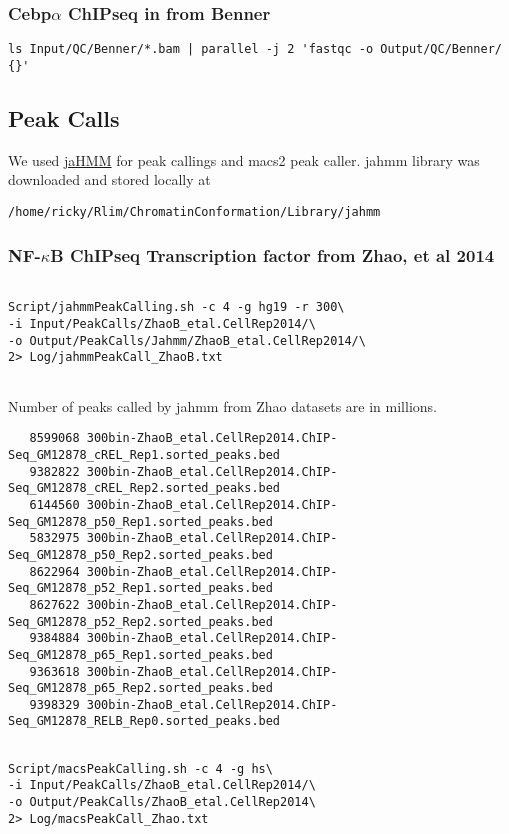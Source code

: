 \documentclass{article}\usepackage[]{graphicx}\usepackage[]{color}
\begin{document}
\subsubsection{Cebp$\alpha$ ChIPseq in from Benner}
\begin{verbatim}
ls Input/QC/Benner/*.bam | parallel -j 2 'fastqc -o Output/QC/Benner/ {}'
\end{verbatim}

\subsection{Peak Calls}
We used \href{https://github.com/gui11aume/zerone/tree/master/doc}{jaHMM} for peak callings and macs2 peak caller.
jahmm library was downloaded and stored locally at 

\verb|/home/ricky/Rlim/ChromatinConformation/Library/jahmm|

\subsubsection{NF-$\kappa$B ChIPseq Transcription factor from Zhao, et al 2014}
\begin{verbatim}

Script/jahmmPeakCalling.sh -c 4 -g hg19 -r 300\ 
-i Input/PeakCalls/ZhaoB_etal.CellRep2014/\ 
-o Output/PeakCalls/Jahmm/ZhaoB_etal.CellRep2014/\ 
2> Log/jahmmPeakCall_ZhaoB.txt 


\end{verbatim}

Number of peaks called by jahmm from Zhao datasets are in millions. 
\begin{verbatim}
   8599068 300bin-ZhaoB_etal.CellRep2014.ChIP-Seq_GM12878_cREL_Rep1.sorted_peaks.bed
   9382822 300bin-ZhaoB_etal.CellRep2014.ChIP-Seq_GM12878_cREL_Rep2.sorted_peaks.bed
   6144560 300bin-ZhaoB_etal.CellRep2014.ChIP-Seq_GM12878_p50_Rep1.sorted_peaks.bed
   5832975 300bin-ZhaoB_etal.CellRep2014.ChIP-Seq_GM12878_p50_Rep2.sorted_peaks.bed
   8622964 300bin-ZhaoB_etal.CellRep2014.ChIP-Seq_GM12878_p52_Rep1.sorted_peaks.bed
   8627622 300bin-ZhaoB_etal.CellRep2014.ChIP-Seq_GM12878_p52_Rep2.sorted_peaks.bed
   9384884 300bin-ZhaoB_etal.CellRep2014.ChIP-Seq_GM12878_p65_Rep1.sorted_peaks.bed
   9363618 300bin-ZhaoB_etal.CellRep2014.ChIP-Seq_GM12878_p65_Rep2.sorted_peaks.bed
   9398329 300bin-ZhaoB_etal.CellRep2014.ChIP-Seq_GM12878_RELB_Rep0.sorted_peaks.bed
\end{verbatim}

\begin{verbatim}

Script/macsPeakCalling.sh -c 4 -g hs\ 
-i Input/PeakCalls/ZhaoB_etal.CellRep2014/\
-o Output/PeakCalls/ZhaoB_etal.CellRep2014\ 
2> Log/macsPeakCall_Zhao.txt

\end{verbatim}
\end{document}
